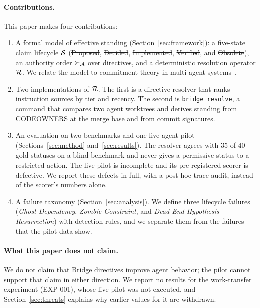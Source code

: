 \paragraph{Contributions.}
This paper makes four contributions:
\begin{enumerate}
    \item A formal model of effective standing (Section~\ref{sec:framework}): a five-state claim lifecycle $\mathcal{S}$ (\st{Proposed}, \st{Decided}, \st{Implemented}, \st{Verified}, and \st{Obsolete}), an authority order $\succ_{\mathcal{A}}$ over directives, and a deterministic resolution operator $\mathcal{R}$. We relate the model to commitment theory in multi-agent systems~\cite{singh1999commit}.
    \item Two implementations of $\mathcal{R}$. The first is a directive resolver that ranks instruction sources by tier and recency. The second is \texttt{bridge resolve}, a command that compares two agent worktrees and derives standing from CODEOWNERS at the merge base and from commit signatures.
    \item An evaluation on two benchmarks and one live-agent pilot (Sections~\ref{sec:method} and~\ref{sec:results}). The resolver agrees with 35 of 40 gold statuses on a blind benchmark and never gives a permissive status to a restricted action. The live pilot is incomplete and its pre-registered scorer is defective. We report these defects in full, with a post-hoc trace audit, instead of the scorer's numbers alone.
    \item A failure taxonomy (Section~\ref{sec:analysis}). We define three lifecycle failures (\emph{Ghost Dependency}, \emph{Zombie Constraint}, and \emph{Dead-End Hypothesis Resurrection}) with detection rules, and we separate them from the failures that the pilot data show.
\end{enumerate}

\paragraph{What this paper does not claim.}
We do not claim that Bridge directives improve agent behavior; the pilot cannot support that claim in either direction. We report no results for the work-transfer experiment (EXP-001), whose live pilot was not executed, and Section~\ref{sec:threats} explains why earlier values for it are withdrawn.
